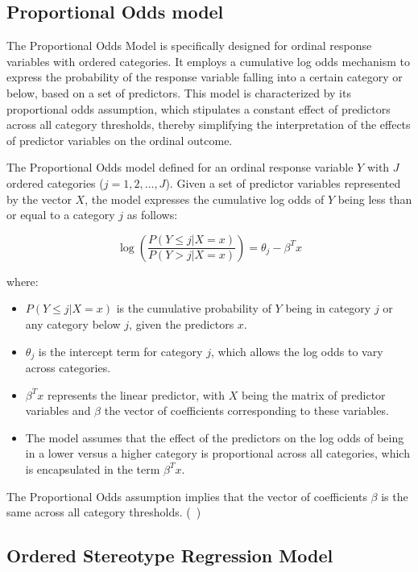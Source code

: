\documentclass{article}
\begin{document}
\subsection{Proportional Odds model}

The Proportional Odds Model is specifically designed for ordinal response variables with ordered categories. It employs a cumulative log odds mechanism to express the probability of the response variable falling into a certain category or below, based on a set of predictors. This model is characterized by its proportional odds assumption, which stipulates a constant effect of predictors across all category thresholds, thereby simplifying the interpretation of the effects of predictor variables on the ordinal outcome.

The Proportional Odds model defined for an ordinal response variable $Y$ with $J$ ordered categories ($j=1, 2, \ldots, J$). 
Given a set of predictor variables represented by the vector $X$, the model expresses the cumulative log odds of $Y$ being less than or equal to a category $j$ as follows:

\[
\log\left(\frac{P(Y \leq j | X = x)}{P(Y > j | X = x)}\right) = \theta_j - \beta^T x
\]

where:
\begin{itemize}
    \item $P(Y \leq j | X = x)$ is the cumulative probability of $Y$ being in category $j$ or any category below $j$, given the predictors $x$.
    \item $\theta_j$ is the intercept term for category $j$, which allows the log odds to vary across categories.
    \item $\beta^T x$ represents the linear predictor, with $X$ being the matrix of predictor variables and $\beta$ the vector of coefficients corresponding to these variables.
    \item The model assumes that the effect of the predictors on the log odds of being in a lower versus a higher category is proportional across all categories, which is encapsulated in the term $\beta^T x$.
\end{itemize}

The Proportional Odds assumption implies that the vector of coefficients $\beta$ is the same across all category thresholds. (~\cite{mccullagh1980regression})

\subsection{Ordered Stereotype Regression Model}
\end{document}
